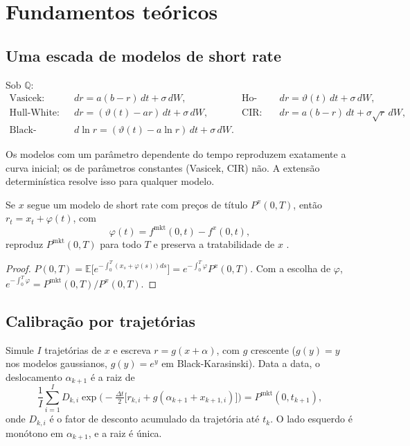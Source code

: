 \section{Fundamentos teóricos}

\subsection{Uma escada de modelos de short rate}

\begin{definicao}
Sob $\mathbb Q$:
\begin{align*}
\text{Vasicek:}\quad & dr=a(b-r)\,dt+\sigma\,dW, &
\text{Ho-Lee:}\quad & dr=\vartheta(t)\,dt+\sigma\,dW,\\
\text{Hull-White:}\quad & dr=(\vartheta(t)-ar)\,dt+\sigma\,dW, &
\text{CIR:}\quad & dr=a(b-r)\,dt+\sigma\sqrt r\,dW,\\
\text{Black-Karasinski:}\quad & d\ln r=(\vartheta(t)-a\ln r)\,dt+\sigma\,dW.
\end{align*}
\end{definicao}

Os modelos com um parâmetro dependente do tempo reproduzem exatamente a curva inicial; os de parâmetros constantes (Vasicek, CIR) não. A extensão determinística resolve isso para qualquer modelo.

\begin{proposicao}
Se $x$ segue um modelo de short rate com preços de título $P^x(0,T)$, então $r_t=x_t+\varphi(t)$, com
\begin{equation}
\varphi(t)=f^{\mathrm{mkt}}(0,t)-f^{x}(0,t),
\end{equation}
reproduz $P^{\mathrm{mkt}}(0,T)$ para todo $T$ e preserva a tratabilidade de $x$ \citep{brigomercurio2006}.
\end{proposicao}

\begin{proof}
$P(0,T)=\mathbb E\big[e^{-\int_0^T(x_s+\varphi(s))ds}\big]=e^{-\int_0^T\varphi}P^x(0,T)$. Com a escolha de $\varphi$, $e^{-\int_0^T\varphi}=P^{\mathrm{mkt}}(0,T)/P^x(0,T)$.
\end{proof}

\subsection{Calibração por trajetórias}

\begin{proposicao}
Simule $I$ trajetórias de $x$ e escreva $r=g(x+\alpha)$, com $g$ crescente ($g(y)=y$ nos modelos gaussianos, $g(y)=e^y$ em Black-Karasinski). Data a data, o deslocamento $\alpha_{k+1}$ é a raiz de
\begin{equation}
\frac1I\sum_{i=1}^I D_{k,i}\exp\Big(-\tfrac{\Delta t}{2}\big[r_{k,i}+g(\alpha_{k+1}+x_{k+1,i})\big]\Big)=P^{\mathrm{mkt}}(0,t_{k+1}),
\end{equation}
onde $D_{k,i}$ é o fator de desconto acumulado da trajetória até $t_k$. O lado esquerdo é monótono em $\alpha_{k+1}$, e a raiz é única.
\end{proposicao}

